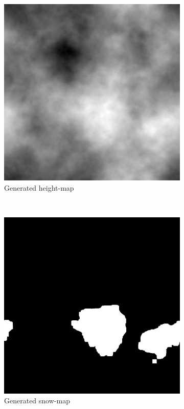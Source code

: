 \documentclass{article}
\begin{document}
\begin{figure}[H]
\centering
    \begin{subfigure}[b]{0.45\textwidth}
        \centering
        \includegraphics[scale=0.15]{heightMap}
        \caption{Generated height-map}
        \label{fig:heightMap}
    \end{subfigure}
    ~
    \begin{subfigure}[b]{0.45\textwidth}
        \centering
        \includegraphics[scale=0.15]{snowMap}
        \caption{Generated snow-map}
        \label{fig:snowMap}
    \end{subfigure}
    \caption{}
    \label{fig:heightMapSnowMap}
\end{figure}
\end{document}
